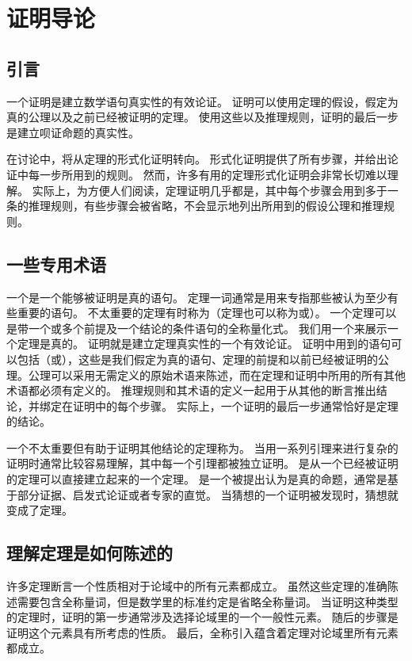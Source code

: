 
\section{证明导论}
{
    \subsection{引言}
    {
        一个证明是建立数学语句真实性的有效论证。
        证明可以使用定理的假设，假定为真的公理以及之前已经被证明的定理。
        使用这些以及推理规则，证明的最后一步是建立呗证命题的真实性。

        在讨论中，将从定理的形式化证明转向。
        形式化证明提供了所有步骤，并给出论证中每一步所用到的规则。
        然而，许多有用的定理形式化证明会非常长切难以理解。
        实际上，为方便人们阅读，定理证明几乎都是，其中每个步骤会用到多于一条的推理规则，有些步骤会被省略，不会显示地列出所用到的假设公理和推理规则。
    }

    \subsection{一些专用术语}
    {
        一个是一个能够被证明是真的语句。
        定理一词通常是用来专指那些被认为至少有些重要的语句。
        不太重要的定理有时称为（定理也可以称为或）。
        一个定理可以是带一个或多个前提及一个结论的条件语句的全称量化式。
        我们用一个来展示一个定理是真的。
        证明就是建立定理真实性的一个有效论证。
        证明中用到的语句可以包括（或），这些是我们假定为真的语句、定理的前提和以前已经被证明的公理。公理可以采用无需定义的原始术语来陈述，而在定理和证明中所用的所有其他术语都必须有定义的。
        推理规则和其术语的定义一起用于从其他的断言推出结论，并绑定在证明中的每个步骤。
        实际上，一个证明的最后一步通常恰好是定理的结论。

        一个不太重要但有助于证明其他结论的定理称为。
        当用一系列引理来进行复杂的证明时通常比较容易理解，其中每一个引理都被独立证明。
        是从一个已经被证明的定理可以直接建立起来的一个定理。
        是一个被提出认为是真的命题，通常是基于部分证据、启发式论证或者专家的直觉。
        当猜想的一个证明被发现时，猜想就变成了定理。
    }

    \subsection{理解定理是如何陈述的}
    {
        许多定理断言一个性质相对于论域中的所有元素都成立。
        虽然这些定理的准确陈述需要包含全称量词，但是数学里的标准约定是省略全称量词。
        当证明这种类型的定理时，证明的第一步通常涉及选择论域里的一个一般性元素。
        随后的步骤是证明这个元素具有所考虑的性质。
        最后，全称引入蕴含着定理对论域里所有元素都成立。
    }

}
